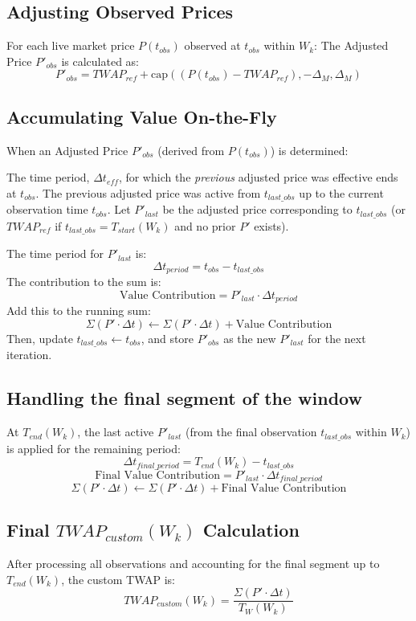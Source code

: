 \documentclass{article}
\begin{document}
\subsection*{Adjusting Observed Prices}
For each live market price $P(t_{obs})$ observed at $t_{obs}$ within $W_k$:
The Adjusted Price $P'_{obs}$ is calculated as:
\[ P'_{obs} = TWAP_{ref} + \text{cap} \left( (P(t_{obs}) - TWAP_{ref}), -\Delta_M, \Delta_M \right) \]

\subsection*{Accumulating Value On-the-Fly}
When an Adjusted Price $P'_{obs}$ (derived from $P(t_{obs})$) is determined:

The time period, $\Delta t_{eff}$, for which the \textit{previous} adjusted price was effective ends at $t_{obs}$.
The previous adjusted price was active from $t_{last\_obs}$ up to the current observation time $t_{obs}$.
Let $P'_{last}$ be the adjusted price corresponding to $t_{last\_obs}$ (or $TWAP_{ref}$ if $t_{last\_obs} = T_{start}(W_k)$ and no prior $P'$ exists).

The time period for $P'_{last}$ is:
\[ \Delta t_{period} = t_{obs} - t_{last\_obs} \]
The contribution to the sum is:
\[ \text{Value Contribution} = P'_{last} \cdot \Delta t_{period} \]
Add this to the running sum:
\[ \Sigma (P' \cdot \Delta t) \leftarrow \Sigma (P' \cdot \Delta t) + \text{Value Contribution} \]
Then, update $t_{last\_obs} \leftarrow t_{obs}$, and store $P'_{obs}$ as the new $P'_{last}$ for the next iteration.

\subsection*{Handling the final segment of the window}
At $T_{end}(W_k)$, the last active $P'_{last}$ (from the final observation $t_{last\_obs}$ within $W_k$) is applied for the remaining period:
\[ \Delta t_{final\_period} = T_{end}(W_k) - t_{last\_obs} \]
\[ \text{Final Value Contribution} = P'_{last} \cdot \Delta t_{final\_period} \]
\[ \Sigma (P' \cdot \Delta t) \leftarrow \Sigma (P' \cdot \Delta t) + \text{Final Value Contribution} \]

\subsection*{Final $TWAP_{custom}(W_k)$ Calculation}
After processing all observations and accounting for the final segment up to $T_{end}(W_k)$, the custom TWAP is:
\[ TWAP_{custom}(W_k) = \frac{\Sigma (P' \cdot \Delta t)}{T_W(W_k)} \]
\end{document}
